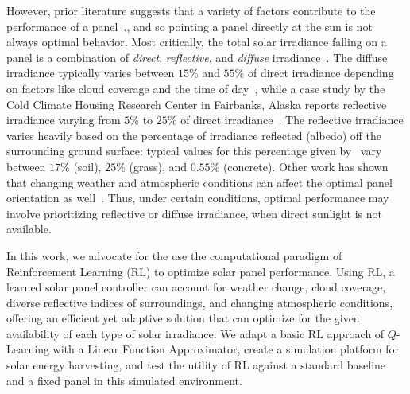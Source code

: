 \documentclass[11pt]{article}
\begin{document}
However, prior literature suggests that a variety of factors contribute to the performance of a panel~\cite{King2001}., and so pointing a panel directly at the sun is not always optimal behavior. Most critically, the total solar irradiance falling on a panel is a combination of {\it direct}, {\it reflective}, and {\it diffuse} irradiance~\cite{Benghanem2011}. The diffuse irradiance typically varies between $15\%$ and $55\%$ of direct irradiance depending on factors like cloud coverage and the time of day~\cite{peterson1981ratio}, while a case study by the Cold Climate Housing Research Center in Fairbanks, Alaska reports reflective irradiance varying from $5\%$ to $25\%$ of direct irradiance~\cite{colgan2010}. The reflective irradiance varies heavily based on the percentage of irradiance reflected (albedo) off the surrounding ground surface: typical values for this percentage given by~\citet{mcevoy2003practical} vary between $17\%$ (soil), $25\%$ (grass), and $0.55\%$ (concrete). Other work has shown that changing weather and atmospheric conditions can affect the optimal panel orientation as well~\cite{Kelly2009}. Thus, under certain conditions, optimal performance may involve prioritizing reflective or diffuse irradiance, when direct sunlight is not available.

In this work, we advocate for the use the computational paradigm of Reinforcement Learning (RL) to optimize solar panel performance. Using RL, a learned solar panel controller can account for weather change, cloud coverage, diverse reflective indices of surroundings, and changing atmospheric conditions, offering an efficient yet adaptive solution that can optimize for the given availability of each type of solar irradiance. We adapt a basic RL approach of $Q$-Learning with a Linear Function Approximator, create a simulation platform for solar energy harvesting, and test the utility of RL against a standard baseline and a fixed panel in this simulated environment.


\end{document}
